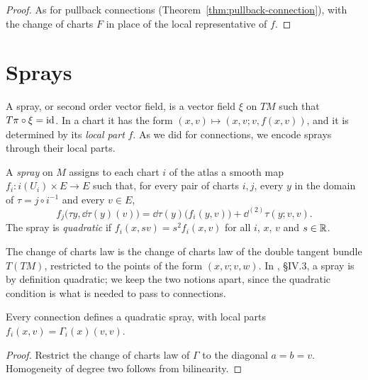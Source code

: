 \begin{proof}
  \leanok
  As for pullback connections (Theorem~\ref{thm:pullback-connection}), with the change of charts
  $F$ in place of the local representative of $f$.
\end{proof}

\section{Sprays}

A spray, or second order vector field, is a vector field $\xi$ on $TM$ such that
$T\pi \circ \xi = \mathrm{id}$. In a chart it has the form $(x, v) \mapsto (x, v; v, f(x, v))$, and it is
determined by its \emph{local part} $f$. As we did for connections, we encode sprays through their
local parts.

\begin{definition}[Spray]
  \label{def:spray}
  \leanok
  A \emph{spray} on $M$ assigns to each chart $i$ of the atlas a smooth map
  $f_i \colon i(U_i) \times E \to E$ such that, for every pair of charts $i, j$, every $y$ in the
  domain of $\tau = j \circ i^{-1}$ and every $v \in E$,
  \[
    f_j\bigl(\tau y, \dd\tau(y)(v)\bigr) = \dd\tau(y)\bigl(f_i(y, v)\bigr) + \dd^{(2)}\tau(y; v, v).
  \]
  The spray is \emph{quadratic} if $f_i(x, s v) = s^2 f_i(x, v)$ for all $i$, $x$, $v$ and
  $s \in \mathbb{R}$.
\end{definition}

The change of charts law is the change of charts law of the double tangent bundle $T(TM)$,
restricted to the points of the form $(x, v; v, w)$. In \cite{Lan99}, \S IV.3, a spray is by
definition quadratic; we keep the two notions apart, since the quadratic condition is what is
needed to pass to connections.

\begin{proposition}
  \label{prop:conn-to-spray}
  \leanok
  Every connection defines a quadratic spray, with local parts $f_i(x, v) = \Gamma_i(x)(v, v)$.
\end{proposition}

\begin{proof}
  \leanok
  Restrict the change of charts law of $\Gamma$ to the diagonal $a = b = v$. Homogeneity of degree
  two follows from bilinearity.
\end{proof}

